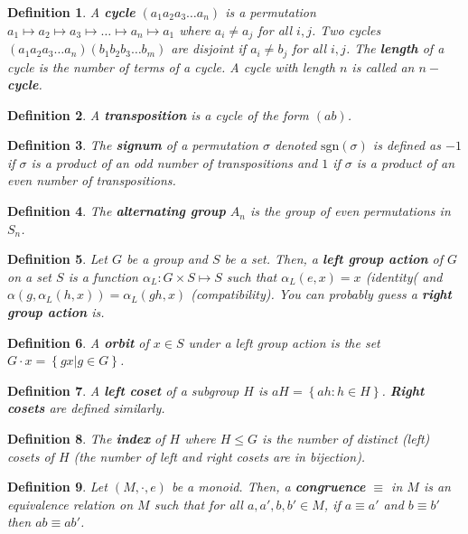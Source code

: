 \documentclass{article}
\newtheorem{definition}{Definition}
\newcommand{\set}[1]{\left\{ #1 \right\}}
\theoremstyle{definition}
\begin{document}
\begin{definition}
    A \textbf{cycle} $(a_1 a_2 a_3 \ldots a_n)$ is a permutation $a_1 \mapsto a_2 \mapsto a_3 \mapsto \ldots \mapsto a_n \mapsto a_1$ where $a_i \neq a_j$ for all $i,j$. Two cycles $(a_1 a_2 a_3 \ldots a_n)(b_1 b_2 b_3 \ldots b_m)$ are disjoint if $a_i \neq b_j$ for all $i,j$. The \textbf{length} of a cycle is the number of terms of a cycle. A cycle with length $n$ is called an $n-$\textbf{cycle}.
\end{definition}
\begin{definition}
    A \textbf{transposition} is a cycle of the form $(ab)$.
\end{definition}
\begin{definition}
    The \textbf{signum} of a permutation $\sigma$ denoted $\mathrm{sgn}(\sigma)$ is defined as $-1$ if $\sigma$ is a product of an odd number of transpositions and $1$ if $\sigma$ is a product of an even number of transpositions.
\end{definition}
\begin{definition}
    The \textbf{alternating group} $A_n$ is the group of even permutations in $S_n$.
\end{definition}
\begin{definition}
   Let $G$ be a group and $S$ be a set. Then, a \textbf{left group action} of $G$ on a set $S$ is a function $\alpha_L : G \times S \mapsto S$ such that $\alpha_L(e,x) = x$ (identity( and $\alpha(g,\alpha_L(h,x)) = \alpha_L(gh,x)$ (compatibility). You can probably guess a \textbf{right group action} is.
\end{definition}
\begin{definition}
    A \textbf{orbit} of $x \in S$ under a left group action is the set $G\cdot x = \set{gx | g \in G}$. 
\end{definition}
\begin{definition}
    A \textbf{left coset} of a subgroup $H$ is $aH = \set{ah : h \in H}$. \textbf{Right cosets} are defined similarly.
\end{definition}
\begin{definition}
    The \textbf{index} of $H$ where $H \leq G$ is the number of distinct (left) cosets of $H$ (the number of left and right cosets are in bijection).
\end{definition}
\begin{definition}
    Let $(M,\cdot,e)$ be a monoid. Then, a \textbf{congruence} $\equiv$ in $M$ is an equivalence relation on $M$ such that for all $a,a',b,b' \in M$, if $a \equiv a'$ and $b \equiv b'$ then $ab \equiv ab'$.
\end{definition}
\end{document}
